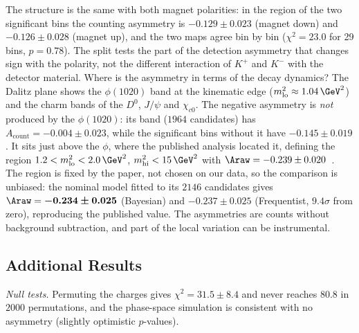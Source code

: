 The structure is the same with both magnet polarities: in the region of the two significant bins the counting asymmetry is $-0.129\pm0.023$ (magnet down) and $-0.126\pm0.028$ (magnet up), and the two maps agree bin by bin ($\chi^2=23.0$ for 29 bins, $p=0.78$). The split tests the part of the detection asymmetry that changes sign with the polarity, not the different interaction of $K^+$ and $K^-$ with the detector material.
Where is the asymmetry in terms of the decay dynamics? The Dalitz plane shows the $\phi(1020)$ band at the kinematic edge ($m^2_{\mathrm{lo}}\approx1.04\,\GeV^2$) and the charm bands of the $D^0$, $J/\psi$ and $\chi_{c0}$. The negative asymmetry is \emph{not} produced by the $\phi(1020)$: its band ($1964$ candidates) has $A_{\mathrm{count}}=-0.004\pm0.023$, while the significant bins without it have $-0.145\pm0.019$. It sits just above the $\phi$, where the published analysis located it, defining the region $1.2<m^2_{\mathrm{lo}}<2.0\,\GeV^2$, $m^2_{\mathrm{hi}}<15\,\GeV^2$ with $\Araw=-0.239\pm0.020$~\cite{lhcb_cpv_2013}. The region is fixed by the paper, not chosen on our data, so the comparison is unbiased: the nominal model fitted to its $2146$ candidates gives $\Araw=\bnum{-0.234\pm0.025}$ (Bayesian) and $-0.237\pm0.025$ (Frequentist, $9.4\sigma$ from zero), reproducing the published value.
The asymmetries are counts without background subtraction, and part of the local variation can be instrumental.
\subsection{Additional Results}
\emph{Null tests.} Permuting the charges gives $\chi^2=31.5\pm8.4$ and never reaches $80.8$ in $2000$ permutations, and the phase-space simulation is consistent with no asymmetry (slightly optimistic $p$-values).
